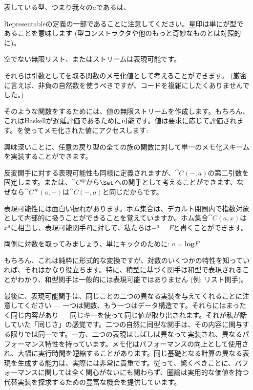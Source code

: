表している型、つまり我々の$a$であるは、\code

{Representable}の定義の一部であることに注意してください。星印は単にが型であることを意味します (型コンストラクタや他のもっと奇妙なものとは対照的に)。

空でない無限リスト、またはストリームは表現可能です。

それらは引数としてを取る関数のメモ化値として考えることができます。 (厳密に言えば、非負の自然数を使うべきですが、コードを複雑にしたくありませんでした。) 

そのような関数をするためには、値の無限ストリームを作成します。もちろん、これはHaskellが遅延評価であるために可能です。値は要求に応じて評価されます。を使ってメモ化された値にアクセスします: 

興味深いことに、任意の戻り型の全ての族の関数に対して単一のメモ化スキームを実装することができます。

反変関手に対する表現可能性も同様に定義されますが、$\cat{C}(-, a)$の第二引数を固定します。または、$\cat{C}^\mathit{op}$から$\Set$への関手として考えることができます、なぜなら$\cat{C}^\mathit{op}(a, -)$は$\cat{C}(-, a)$と同じだからです。

表現可能性には面白い捩れがあります。ホム集合は、デカルト閉圏内で指数対象として内部的に扱うことができることを覚えていますか。ホム集合$\cat{C}(a, x)$は$x^a$に相当し、表現可能関手$F$に対して、私たちは$-^a = F$と書くことができます。

両側に対数を取ってみましょう、単にキックのために: $a = \mathbf{log}F$

もちろん、これは純粋に形式的な変換ですが、対数のいくつかの特性を知っていれば、それはかなり役立ちます。特に、積型に基づく関手は和型で表現されることがわかり、和型関手は一般的には表現可能ではありません (例: リスト関手)。

最後に、表現可能関手は、同じことの二つの異なる実装を与えてくれることに注意してください --- 一つは関数、もう一つはデータ構造です。それらにはまったく同じ内容があり --- 同じキーを使って同じ値が取り出されます。それが私が話していた「同じさ」の感覚です。二つの自然に同型な関手は、その内容に関与する限りでは同一です。一方、二つの表現はしばしば異なって実装され、異なるパフォーマンス特性を持っています。メモ化はパフォーマンスの向上として使用され、大幅に実行時間を短縮することがあります。同じ基礎となる計算の異なる表現を生成する能力は、実際には非常に貴重です。従って、驚くべきことに、パフォーマンスに関しては全く関心がないにも関わらず、圏論は実用的な価値を持つ代替実装を探求するための豊富な機会を提供しています。

